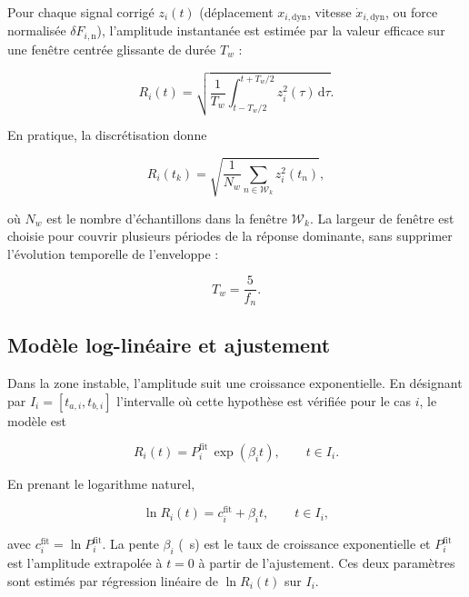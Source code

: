 \documentclass[11pt,a4paper]{article}
\newcommand{\xdyn}{x_{i,\mathrm{dyn}}}        %
\newcommand{\xdoti}{\dot{x}_{i,\mathrm{dyn}}} %
\newcommand{\dFin}{\delta F_{i,\mathrm{n}}}    %
\newcommand{\Rik}{R_i(t_k)}                    %
\newcommand{\Tw}{T_w}                          %
\newcommand{\betai}{\beta_i}                   %
\newcommand{\Pfit}{P_i^{\mathrm{fit}}}         %
\newcommand{\cfit}{c_i^{\mathrm{fit}}}         %
\begin{document}
Pour chaque signal corrigé \(z_i(t)\) (déplacement \(\xdyn\), vitesse \(\xdoti\),
ou force normalisée \(\dFin\)), l'amplitude instantanée est estimée par la
valeur efficace sur une fenêtre centrée glissante de durée \(\Tw\) :

\begin{equation}
    R_i(t) =
    \sqrt{
        \frac{1}{\Tw}
        \int_{t-\Tw/2}^{t+\Tw/2} z_i^2(\tau)\,\mathrm{d}\tau
    }.
    \label{eq:rms-cont}
\end{equation}

En pratique, la discrétisation donne

\begin{equation}
    \Rik =
    \sqrt{
        \frac{1}{N_w}
        \sum_{n\in\mathcal{W}_k} z_i^2(t_n)
    },
    \label{eq:rms-disc}
\end{equation}

où \(N_w\) est le nombre d'échantillons dans la fenêtre \(\mathcal{W}_k\). La
largeur de fenêtre est choisie pour couvrir plusieurs périodes de la réponse
dominante, sans supprimer l'évolution temporelle de l'enveloppe :

\begin{equation}
    \Tw = \frac{5}{f_n}.
    \label{eq:Tw}
\end{equation}

\subsection{Modèle log-linéaire et ajustement}
\label{subsec:logfit}

Dans la zone instable, l'amplitude suit une croissance exponentielle. En
désignant par \(I_i = [t_{a,i}, t_{b,i}]\) l'intervalle où cette hypothèse
est vérifiée pour le cas \(i\), le modèle est

\begin{equation}
    R_i(t) = \Pfit\,\exp(\betai t), \qquad t \in I_i.
    \label{eq:exp-model}
\end{equation}

En prenant le logarithme naturel,

\begin{equation}
    \ln R_i(t) = \cfit + \betai t, \qquad t \in I_i,
    \label{eq:loglinear}
\end{equation}

avec \(\cfit = \ln\Pfit\). La pente \(\betai\) (\si{\per\second}) est le taux de
croissance exponentielle et \(\Pfit\) est l'amplitude extrapolée à \(t=0\) à
partir de l'ajustement. Ces deux paramètres sont estimés par régression linéaire
de \(\ln R_i(t)\) sur \(I_i\).
\end{document}
